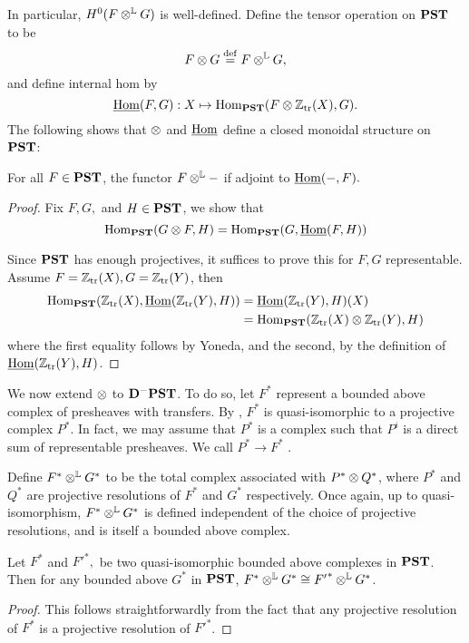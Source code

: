 In particular, $H^0(F \tL G)$ is well-defined. Define the tensor 
operation on $\PST$ to be
\[
F \tensor G \defeq F \tL G,
\]
and define internal hom by
\[
\ihom(F, G): X \mapsto \hom_{\PST}(F \tensor \Ztr(X), G).
\]
The following shows that $\tensor$ and $\ihom$ define a closed
monoidal structure on $\PST$:
\begin{lem}
For all $F \in \PST$, the functor $F \tL -$ if adjoint to 
$\ihom(-, F).$
\end{lem}
\begin{proof}
Fix $F, G,$ and $H \in \PST$, we show that
\[
\hom_{\PST}(G \tensor F, H) = \hom_{\PST}(G, \ihom(F, H))
\]

Since $\PST$ has enough projectives, it suffices to prove this 
for $F, G$ representable. Assume $F = \Ztr(X), G = \Ztr(Y)$,
then 
\begin{align*}
\hom_{\PST}(\Ztr(X), \ihom(\Ztr(Y), H)) &=
\ihom(\Ztr(Y), H)(X) \\
&= \hom_{\PST}(\Ztr(X) \tensor \Ztr(Y), H)
\end{align*}
where the first equality follows by Yoneda, and the second, by
the definition of $\ihom(\Ztr(Y), H)$.
\end{proof}

We now extend $\tensor$ to $\DCat[D]^-\PST$. To do so, let $F^*$ 
represent a bounded above complex of presheaves with transfers.
By \cite[10.something]{WH}, $F^*$ is quasi-isomorphic to a 
projective complex $P^*$. In fact, we may assume that $P^*$ is a 
complex such that $P^i$ is a direct sum of representable 
presheaves. We call $P^* \to F^*$ .

Define $F^* \tL G^*$ to be the total complex associated with
$P^* \tensor Q^*$, where $P^*$ and $Q^*$ are projective 
resolutions of $F^*$ and $G^*$ respectively. Once again, up to
quasi-isomorphism, $F^* \tL G^*$ is defined independent of the 
choice of projective resolutions, and is itself a bounded above 
complex. 

\begin{lem}
Let $F^*$ and ${F'}^*,$ be two quasi-isomorphic bounded above 
complexes in $\PST$. Then for any bounded above $G^*$ in $\PST$,
$F^* \tL G^* \cong {F'}^* \tL G^*$.
\end{lem}
\begin{proof}
This follows straightforwardly from the fact that any projective
resolution of $F^*$ is a projective resolution of ${F'}^*$.
\end{proof}


